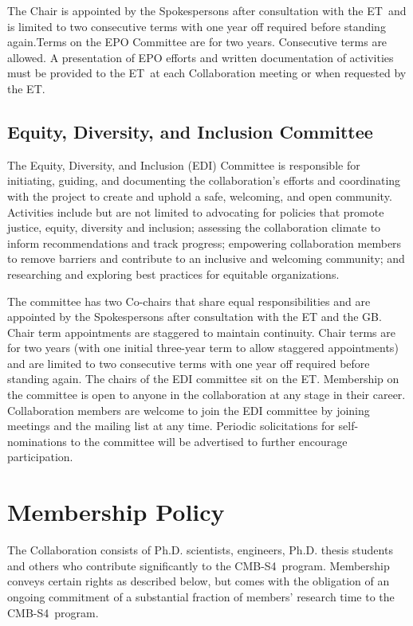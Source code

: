 \documentclass[12pt]{article}
\newcommand{\exec}{{Executive Team}}
\newcommand{\shorte}{{ET}}  %
\newcommand\collabname{CMB-S4}
\begin{document}
The Chair is appointed by the Spokespersons after consultation with the \shorte\  and is limited to two consecutive terms with one year off required before standing again.Terms on the EPO Committee are for two years. Consecutive terms are allowed.  A presentation of EPO efforts and written documentation of activities must be provided to the \shorte\ at each Collaboration meeting or when requested by the \shorte.   

\subsection{Equity, Diversity, and Inclusion Committee}
The Equity, Diversity, and Inclusion (EDI) Committee is responsible for initiating, guiding, and documenting the collaboration's efforts and coordinating with the project to create and uphold a safe, welcoming, and open community. Activities include but are not limited to advocating for policies that promote justice, equity, diversity and inclusion; assessing the collaboration climate to inform recommendations and track progress; empowering collaboration members to remove barriers and contribute to an inclusive and welcoming community; and researching and exploring best practices for equitable organizations.

The committee has two Co-chairs that share equal responsibilities and are appointed by the Spokespersons after consultation with the ET and the GB. Chair term appointments are staggered to maintain continuity. Chair terms are for two years (with one initial three-year term to allow staggered appointments) and are limited to two consecutive terms with one year off required before standing again. The chairs of the EDI committee sit on the ET. Membership on the committee is open to anyone in the collaboration at any stage in their career. Collaboration members are welcome to join the EDI committee by joining meetings and the mailing list at any time. Periodic solicitations for self-nominations to the committee will be advertised to further encourage participation.

\section{Membership Policy}

The Collaboration consists of Ph.D. scientists, engineers, Ph.D. thesis students and others who contribute significantly to the \collabname\ program. Membership conveys certain rights as described below, but comes with the obligation of an ongoing commitment of a substantial fraction of members' research time to the \collabname\ program.
\end{document}
